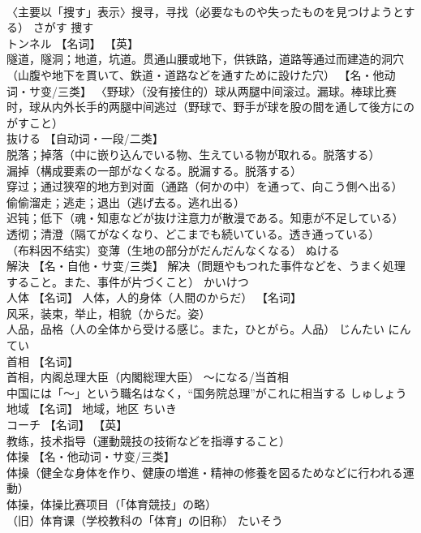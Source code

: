 \documentclass[8pt]{extreport}
\begin{document}
\begin{CJK}{UTF8}{min}
\\	〈主要以「捜す」表示〉搜寻，寻找（必要なものや失ったものを見つけようとする）	さがす	捜す
\\	トンネル	【名词】 【英】
\\	隧道，隧洞；地道，坑道。贯通山腰或地下，供铁路，道路等通过而建造的洞穴（山腹や地下を貫いて、鉄道・道路などを通すために設けた穴） 【名・他动词・サ变/三类】 〈野球〉（没有接住的）球从两腿中间滚过。漏球。棒球比赛时，球从内外长手的两腿中间逃过（野球で、野手が球を股の間を通して後方にのがすこと）		
\\	抜ける	【自动词・一段/二类】 
\\	脱落；掉落（中に嵌り込んでいる物、生えている物が取れる。脱落する） 
\\	漏掉（構成要素の一部がなくなる。脱漏する。脱落する） 
\\	穿过；通过狭窄的地方到对面（通路（何かの中）を通って、向こう側へ出る） 
\\	偷偷溜走；逃走；退出（逃げ去る。逃れ出る） 
\\	迟钝；低下（魂・知恵などが抜け注意力が散漫である。知恵が不足している） 
\\	透彻；清澄（隔てがなくなり、どこまでも続いている。透き通っている） 
\\	（布料因不结实）变薄（生地の部分がだんだんなくなる）	ぬける	
\\	解決	【名・自他・サ变/三类】 解决（問題やもつれた事件などを、うまく処理すること。また、事件が片づくこと）	かいけつ	
\\	人体	【名词】 人体，人的身体（人間のからだ） 【名词】 
\\	风采，装束，举止，相貌（からだ。姿） 
\\	人品，品格（人の全体から受ける感じ。また，ひとがら。人品）	じんたい にんてい	
\\	首相	【名词】 
\\	首相，内阁总理大臣（内閣総理大臣） 〜になる/当首相 
\\	中国には「〜」という職名はなく，“国务院总理”がこれに相当する	しゅしょう	
\\	地域	【名词】 地域，地区	ちいき	
\\	コーチ	【名词】 【英】
\\	教练，技术指导（運動競技の技術などを指導すること）		
\\	体操	【名・他动词・サ变/三类】 
\\	体操（健全な身体を作り、健康の増進・精神の修養を図るためなどに行われる運動） 
\\	体操，体操比赛项目（「体育競技」の略） 
\\	（旧）体育课（学校教科の「体育」の旧称）	たいそう	

\end{CJK}
\end{document}
